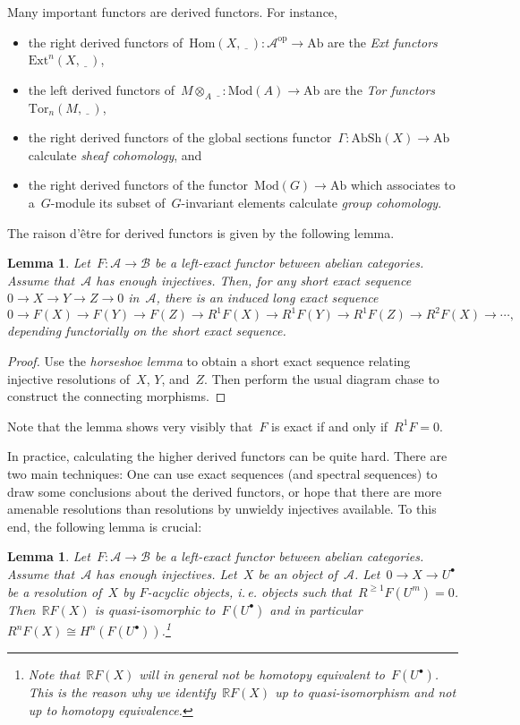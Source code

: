 \documentclass{amsart}
\makeatletter
\theoremstyle{definition}
\theoremstyle{plain}
\newtheorem{lemma}[defn]{Lemma}
\theoremstyle{remark}
\newcommand{\A}{\mathcal{A}}
\newcommand{\B}{\mathcal{B}}
\newcommand{\RR}{\mathbb{R}}
\newcommand{\Ext}{\mathrm{Ext}}
\newcommand{\Tor}{\mathrm{Tor}}
\newcommand{\Hom}{\mathrm{Hom}}
\newcommand{\placeholder}{\underline{\ \ \ }}
\newcommand{\Ab}{\mathrm{Ab}}
\newcommand{\AbSh}{\mathrm{AbSh}}
\newcommand{\Mod}{\mathrm{Mod}}
\newcommand{\op}{\mathrm{op}}
\newcommand{\?}{\,{:}\,}
\renewcommand{\_}{\mathpunct{.}\,}
\newcommand{\ie}{i.\,e.\@\xspace}
\makeatother
\begin{document}
Many important functors are derived functors. For instance,
\begin{itemize}
\item the right derived functors of~$\Hom(X, \placeholder) : \A^\op \to
\Ab$ are the \emph{Ext functors} $\Ext^n(X, \placeholder)$,
\item the left derived functors of~$M \otimes_A \placeholder : \Mod(A) \to \Ab$
are the \emph{Tor functors} $\Tor_n(M, \placeholder)$,
\item the right derived functors of the global sections functor~$\Gamma :
\AbSh(X) \to \Ab$ calculate \emph{sheaf cohomology}, and
\item the right derived functors of the functor~$\Mod(G) \to \Ab$ which associates to
a~$G$-module its subset of~$G$-invariant elements calculate \emph{group
cohomology}.
\end{itemize}

The raison d'être for derived functors is given by the following lemma.

\begin{lemma}Let~$F : \A \to \B$ be a left-exact functor between abelian
categories. Assume that~$\A$ has enough injectives. Then, for any short exact
sequence~$0 \to X \to Y \to Z \to 0$ in~$\A$, there is an induced long exact
sequence
\[ 0 \to F(X) \to F(Y) \to F(Z) \to R^1 F(X) \to R^1 F(Y) \to R^1 F(Z) \to R^2
F(X) \to \cdots, \]
depending functorially on the short exact sequence.\end{lemma}
\begin{proof}Use the \emph{horseshoe lemma} to obtain a short exact sequence
relating injective resolutions of~$X$, $Y$, and~$Z$. Then perform the usual
diagram chase to construct the connecting morphisms.\end{proof}

Note that the lemma shows very visibly that~$F$ is exact if and only if~$R^1 F
= 0$.

In practice, calculating the higher derived functors can be quite hard. There
are two main techniques: One can use exact sequences (and spectral sequences)
to draw some conclusions about the derived functors, or hope that there are
more amenable resolutions than resolutions by unwieldy injectives available. To
this end, the following lemma is crucial:

\begin{lemma}Let~$F : \A \to \B$ be a left-exact functor between abelian
categories. Assume that~$\A$ has enough injectives. Let~$X$ be an object
of~$\A$. Let~$0 \to X \to U^\bullet$ be a resolution of~$X$ by
\emph{$F$-acyclic objects}, \ie objects such that~$R^{\geq 1}F(U^m) = 0$.
Then~$\RR F(X)$ is quasi-isomorphic to~$F(U^\bullet)$ and in particular~$R^n
F(X) \cong H^n(F(U^\bullet))$.\footnote{Note that~$\RR F(X)$ will in general
\emph{not} be homotopy equivalent to~$F(U^\bullet)$. This is the reason why we
identify~$\RR F(X)$ up to quasi-isomorphism and not up to homotopy equivalence.}\end{lemma}
\end{document}
